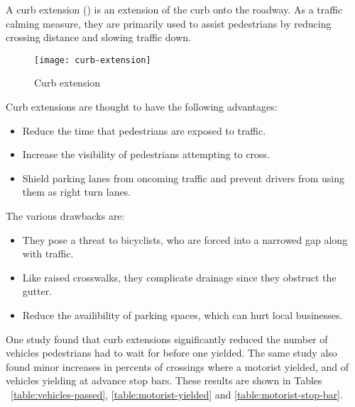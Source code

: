 A curb extension () is an extension of the curb onto the roadway. As a traffic calming measure, they are primarily used to assist pedestrians by reducing crossing distance and slowing traffic down.

\begin{figure}[h]
\centering
\texttt{[image: curb-extension]}
\caption{Curb extension}\label{fig:curb-extension}
\end{figure}

Curb extensions are thought to have the following advantages:\begin{itemize}
\item Reduce the time that pedestrians are exposed to traffic.
\item Increase the visibility of pedestrians attempting to cross.
\item Shield parking lanes from oncoming traffic and prevent drivers from using them as right turn lanes.
\end{itemize}

The various drawbacks are:\begin{itemize}
\item They pose a threat to bicyclists, who are forced into a narrowed gap along with traffic.
\item Like raised crosswalks, they complicate drainage since they obstruct the gutter.
\item Reduce the availibility of parking spaces, which can hurt local businesses.
\end{itemize}

One study \cite{randal05} found that curb extensions significantly reduced the number of vehicles pedestrians had to wait for before one yielded. The same study also found minor increases in percents of crossings where a motorist yielded, and of vehicles yielding at advance stop bars. These results are shown in Tables ~\ref{table:vehicles-passed}, \ref{table:motorist-yielded} and \ref{table:motorist-stop-bar}.



